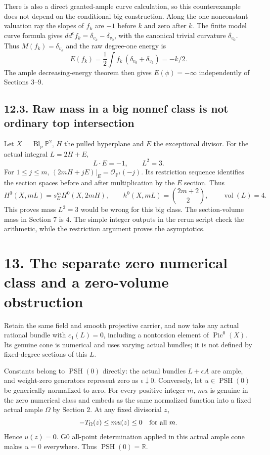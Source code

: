 \documentclass[
  10pt,
]{article}
\begin{document}
There is also a direct granted-ample curve calculation, so this
counterexample does not depend on the conditional big construction.
Along the one nonconstant valuation ray the slopes of \(f_k\) are \(-1\)
before \(k\) and zero after \(k\). The finite model curve formula gives
\(dd^cf_k=\delta_{v_k}-\delta_{v_0}\), with the canonical trivial
curvature \(\delta_{v_0}\). Thus \(M(f_k)=\delta_{v_k}\) and the raw
degree-one energy is
\[E(f_k)=\frac12\int f_k\,(\delta_{v_0}+\delta_{v_k})=-k/2.\] The ample
decreasing-energy theorem then gives \(E(\phi)=-\infty\) independently
of Sections 3--9.

\subsection{12.3. Raw mass in a big nonnef class is not ordinary top
intersection}\label{raw-mass-in-a-big-nonnef-class-is-not-ordinary-top-intersection}

Let \(X=\operatorname{Bl}_p\mathbb P^2\), \(H\) the pulled hyperplane
and \(E\) the exceptional divisor. For the actual integral \(L=2H+E\),
\[L\cdot E=-1,\qquad L^2=3.\] For \(1\leq j\leq m\),
\((2mH+jE)|_E=\mathcal O_{\mathbb P^1}(-j)\). Its restriction sequence
identifies the section spaces before and after multiplication by the
\(E\) section. Thus \[H^0(X,mL)=s_E^mH^0(X,2mH),\qquad
h^0(X,mL)=\binom{2m+2}{2},\qquad \operatorname{vol}(L)=4.\] This proves
mass \(L^2=3\) would be wrong for this big class. The section-volume
mass in Section 7 is \(4\). The simple integer outputs in the rerun
script check the arithmetic, while the restriction argument proves the
asymptotics.

\section{13. The separate zero numerical class and a zero-volume
obstruction}\label{the-separate-zero-numerical-class-and-a-zero-volume-obstruction}

Retain the same field and smooth projective carrier, and now take any
actual rational bundle with \(c_1(L)=0\), including a nontorsion element
of \(\operatorname{Pic}^0(X)\). Its genuine cone is numerical and uses
varying actual bundles; it is not defined by fixed-degree sections of
this \(L\).

Constants belong to \(\operatorname{PSH}(0)\) directly: the actual
bundles \(L+\epsilon A\) are ample, and weight-zero generators represent
zero as \(\epsilon\downarrow0\). Conversely, let
\(u\in\operatorname{PSH}(0)\) be generically normalized to zero. For
every positive integer \(m\), \(mu\) is genuine in the zero numerical
class and embeds as the same normalized function into a fixed actual
ample \(\Omega\) by Section 2. At any fixed divisorial \(z\),
\[-T_\Omega(z)\leq m u(z)\leq0\quad\hbox{for all }m.\] Hence \(u(z)=0\).
G0 all-point determination applied in this actual ample cone makes
\(u=0\) everywhere. Thus \(\operatorname{PSH}(0)=\mathbb R\).
\end{document}

